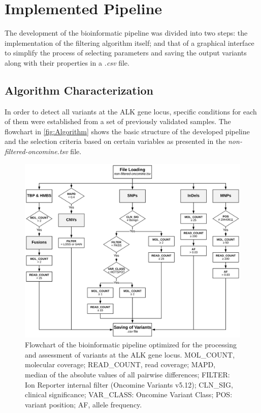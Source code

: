 \section{Implemented Pipeline}

The development of the bioinformatic pipeline was divided into two steps: the implementation of the filtering algorithm itself; and that of a graphical interface to simplify the process of selecting parameters and saving the output variants along with their properties in a \textit{.csv} file.

\subsection{Algorithm Characterization}

In order to detect all variants at the ALK gene locus, specific conditions for each of them were established from a set of previously validated samples. The flowchart in \autoref{fig:Algorithm} shows the basic structure of the developed pipeline and the selection criteria based on certain variables as presented in the \textit{non-filtered-oncomine.tsv} file.

\begin{figure}[ht]
    \centering
    \includegraphics[width=\textwidth]{Images/chapter_4/mut_filtering.png}
    \caption{Flowchart of the bioinformatic pipeline optimized for the processing and assessment of variants at the ALK gene locus. MOL\_COUNT, molecular coverage; READ\_COUNT, read coverage; MAPD, median of the absolute values of all pairwise differences; FILTER: Ion Reporter\texttrademark{} internal filter (Oncomine\texttrademark{} Variants v5.12); CLN\_SIG, clinical significance; VAR\_CLASS: Oncomine\texttrademark{} Variant Class; POS: variant position; AF, allele frequency.}
    \label{fig:Algorithm}
\end{figure}

